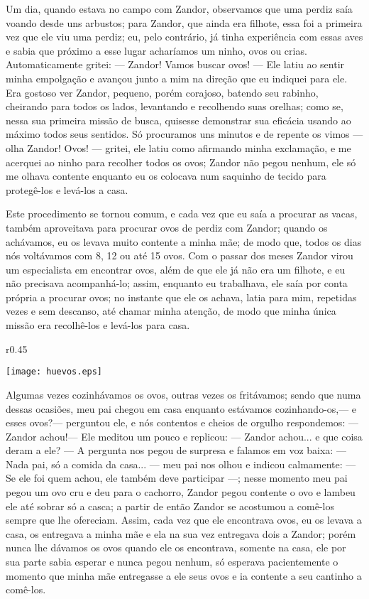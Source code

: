 Um dia, quando estava no campo com Zandor, observamos que uma perdiz saía voando desde uns arbustos; para Zandor, que ainda era filhote, essa foi a primeira vez que ele viu uma perdiz; eu, pelo contrário, já tinha experiência com essas aves e sabia que próximo a esse lugar acharíamos um ninho, ovos ou crias. 
Automaticamente gritei: 
--- Zandor! Vamos buscar ovos! --- 
Ele latiu ao sentir minha empolgação e avançou junto a mim na direção que eu indiquei para ele. 
Era gostoso ver Zandor, pequeno, porém corajoso, batendo seu rabinho, cheirando para todos os lados, levantando e recolhendo suas orelhas; como se, nessa sua primeira missão de busca, quisesse demonstrar sua eficácia usando ao máximo todos seus sentidos. 
Só procuramos uns minutos e de repente os vimos --- olha Zandor! Ovos! --- gritei, ele latiu como afirmando minha exclamação, e me acerquei ao ninho para recolher todos os ovos; Zandor não pegou nenhum, ele só me olhava contente enquanto eu os colocava num saquinho de tecido para protegê-los e levá-los a casa. 


Este procedimento se tornou comum, e cada vez que eu saía a procurar as vacas, também aproveitava para procurar ovos de perdiz com Zandor; quando os achávamos, eu os levava muito contente a minha mãe; de modo que, todos os dias nós voltávamos com 8, 12 ou até 15 ovos. 
Com o passar dos meses Zandor virou um especialista em encontrar ovos, além de que ele já não era um filhote, e eu não precisava acompanhá-lo; assim, enquanto eu trabalhava, ele saía por conta própria a procurar ovos; no instante que ele os achava, latia para mim, repetidas vezes e sem descanso, até chamar minha atenção, de modo que minha única missão era recolhê-los e levá-los para casa.
\ifdefined\EnableIncludeImages
\begin{wrapfigure}{r}{0.45\textwidth}
  \begin{center}
  \vspace{-20pt}
    \texttt{[image: huevos.eps]}
  \end{center}
  \vspace{-20pt}
\end{wrapfigure}
\fi
Algumas vezes cozinhávamos os ovos, outras vezes os fritávamos; sendo que numa dessas ocasiões, meu pai chegou em casa enquanto estávamos cozinhando-os,--- e esses ovos?--- perguntou ele, 
e nós contentos e cheios de orgulho respondemos: 
--- Zandor achou!---
Ele meditou um pouco e replicou: 
--- Zandor achou... e que coisa deram a ele? --- 
A pergunta nos pegou de surpresa e falamos em voz baixa: 
--- Nada pai, só a comida da casa... --- meu pai nos olhou e indicou calmamente: 
--- Se ele foi quem achou, ele também deve participar ---; 
nesse momento meu pai pegou um ovo cru e deu para o cachorro, Zandor pegou contente o ovo e lambeu ele até sobrar só a casca; a partir de então Zandor se acostumou a comê-los sempre que lhe ofereciam. Assim, cada vez que ele encontrava ovos, eu os levava a casa, os entregava a minha mãe e ela na sua vez entregava dois a Zandor; porém nunca lhe dávamos os ovos quando ele os encontrava, somente na casa, ele por sua parte sabia esperar e nunca pegou nenhum, só esperava pacientemente o momento que minha mãe entregasse a ele seus ovos e ia contente a seu cantinho a comê-los.


